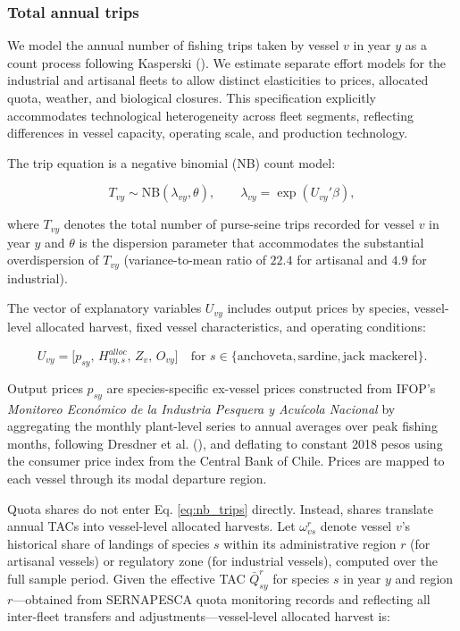 \documentclass[
  11pt,
]{article}
\begin{document}
\subsubsection{Total annual trips}\label{total-annual-trips}

We model the annual number of fishing trips taken by vessel \(v\) in year \(y\) as a count process following Kasperski (). We estimate separate effort models for the industrial and artisanal fleets to allow distinct elasticities to prices, allocated quota, weather, and biological closures. This specification explicitly accommodates technological heterogeneity across fleet segments, reflecting differences in vessel capacity, operating scale, and production technology.

The trip equation is a negative binomial (NB) count model:

\begin{equation}
T_{vy} \sim \text{NB}(\lambda_{vy}, \theta), \qquad \lambda_{vy} = \exp\!\left(U_{vy}'\beta\right), \label{eq:nb_trips}
\end{equation}

where \(T_{vy}\) denotes the total number of purse-seine trips recorded for vessel \(v\) in year \(y\) and \(\theta\) is the dispersion parameter that accommodates the substantial overdispersion of \(T_{vy}\) (variance-to-mean ratio of \(22.4\) for artisanal and \(4.9\) for industrial).

The vector of explanatory variables \(U_{vy}\) includes output prices by species, vessel-level allocated harvest, fixed vessel characteristics, and operating conditions:

\begin{equation}
U_{vy}=\big[p_{sy},\, H^{alloc}_{vy,s},\, Z_v,\, O_{vy}\big] \quad\text{for } s \in \{\text{anchoveta}, \text{sardine}, \text{jack mackerel}\}. \label{eq:U_trips}
\end{equation}

Output prices \(p_{sy}\) are species-specific ex-vessel prices constructed from IFOP's \emph{Monitoreo Económico de la Industria Pesquera y Acuícola Nacional} by aggregating the monthly plant-level series to annual averages over peak fishing months, following Dresdner et al. (), and deflating to constant 2018 pesos using the consumer price index from the Central Bank of Chile. Prices are mapped to each vessel through its modal departure region.

Quota shares do not enter Eq. \eqref{eq:nb_trips} directly. Instead, shares translate annual TACs into vessel-level allocated harvests. Let \(\omega_{vs}^r\) denote vessel \(v\)'s historical share of landings of species \(s\) within its administrative region \(r\) (for artisanal vessels) or regulatory zone (for industrial vessels), computed over the full sample period. Given the effective TAC \(\bar{Q}_{sy}^r\) for species \(s\) in year \(y\) and region \(r\)---obtained from SERNAPESCA quota monitoring records and reflecting all inter-fleet transfers and adjustments---vessel-level allocated harvest is:
\end{document}
